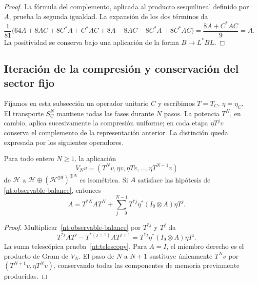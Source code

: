 \begin{proof}
La fórmula del complemento, aplicada al producto sesquilineal
definido por \(A\), prueba la segunda igualdad. La expansión de
los dos términos da
\[
 \frac1{81}\bigl(
 64A+8AC+8C^*A+C^*AC
 +8A-8AC-8C^*A+8C^*AC\bigr)
 =\frac{8A+C^*AC}{9}=A.
\]
La positividad se conserva bajo una aplicación de la forma
\(B\mapsto L^*BL\).
\end{proof}

\subsection{Iteración de la compresión y conservación del sector fijo}

Fijamos en esta subsección un operador unitario \(C\) y escribimos
\(T=T_C\), \(\eta=\eta_C\). El transporte \(S_C^N\) mantiene todas
las fases durante \(N\) pasos. La potencia \(T^N\), en cambio,
aplica sucesivamente la compresión uniforme; en cada etapa
\(\eta T^jv\) conserva el complemento de la representación anterior.
La distinción queda expresada por los siguientes operadores.

\begin{proposition}
Para todo entero \(N\geq1\), la aplicación
\begin{equation}
 V_Nv=(T^Nv,\eta v,\eta Tv,\ldots,\eta T^{N-1}v)
 \label{nt:finite-record}
\end{equation}
de \(\mathcal H\) a
\(\mathcal H\oplus(\mathcal H^{\oplus9})^{\oplus N}\)
es isométrica. Si \(A\) satisface las hipótesis de
\eqref{nt:observable-balance}, entonces
\begin{equation}
 A=T^{*N}AT^N+
 \sum_{j=0}^{N-1}T^{*j}\eta^*(I_9\otimes A)\eta T^j.
 \label{nt:telescopy}
\end{equation}
\end{proposition}

\begin{proof}
Multiplicar~\eqref{nt:observable-balance} por \(T^{*j}\) y
\(T^j\) da
\[
 T^{*j}AT^j-T^{*(j+1)}AT^{j+1}
 =T^{*j}\eta^*(I_9\otimes A)\eta T^j.
\]
La suma telescópica prueba~\eqref{nt:telescopy}. Para \(A=I\),
el miembro derecho es el producto de Gram de \(V_N\).
El paso de \(N\) a \(N+1\) sustituye únicamente \(T^Nv\) por
\((T^{N+1}v,\eta T^Nv)\), conservando todas las componentes
de memoria previamente producidas.
\end{proof}

